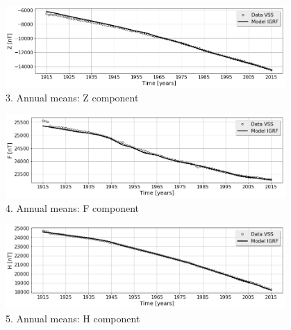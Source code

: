 \documentclass[final,t]{beamer}
\begin{document}
\begin{columns}[t]
\begin{column}{.47\linewidth}
\begin{columns}
\begin{column}{.49\linewidth}
\begin{block}
\vspace{0.7cm}

\begin{figure}
\centering
\includegraphics[scale=0.6]{"figs_ed/Z mean all_v3"}
\caption{3. Annual means: Z component}
\label{fig:Zmeanall_v3}
\end{figure}

\vspace{0.7cm}
\begin{figure}
\centering
\includegraphics[scale=0.6]{"figs_ed/F mean all_v3"}
\caption{4. Annual means: F component}
\label{fig:Fmeanall_v3}
\end{figure}

\vspace{0.7cm}
\begin{figure}
\centering
\includegraphics[scale=0.6]{"figs_ed/H mean all_v3"}
\caption{5. Annual means: H component}
\label{fig:Hmeanall_v3}
\end{figure}

	

  
\end{block}	



\end{column}

\begin{column}{.48\linewidth}


\end{column}
\end{columns}
\end{column}
\end{columns}
\end{document}
